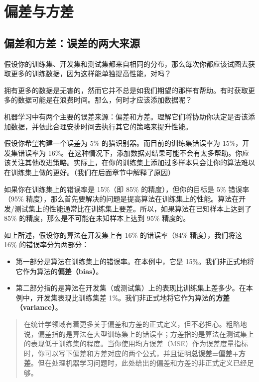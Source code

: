\hypertarget{ux504fux5deeux4e8eux65b9ux5dee}{%
\part{偏差与方差}\label{ux504fux5deeux4e8eux65b9ux5dee}}

\hypertarget{ux504fux5deeux548cux65b9ux5deeux8befux5deeux7684ux4e24ux5927ux6765ux6e90}{%
\chapter{偏差和方差：误差的两大来源}\label{ux504fux5deeux548cux65b9ux5deeux8befux5deeux7684ux4e24ux5927ux6765ux6e90}}

假设你的训练集、开发集和测试集都来自相同的分布，那么每次你都应该试图去获取更多的训练数据，因为这样能单独提高性能，对吗？

拥有更多的数据是无害的，然而它并不总是如我们期望的那样有帮助。有时获取更多的数据可能是在浪费时间。那么，何时才应该添加数据呢？

机器学习中有两个主要的误差来源：偏差和方差。理解它们将协助你决定是否该添加数据，并依此合理安排时间去执行其它的策略来提升性能。

假设你希望构建一个误差为 5\% 的猫识别器。而目前的训练集错误率为
15\%，开发集错误率为
16\%。在这种情况下，添加数据对结果可能不会有太多帮助。你应该关注其他改进策略。实际上，在你的训练集上添加过多样本只会让你的算法难以在训练集上做的更好。（我们在后面章节中解释了原因）

如果你在训练集上的错误率是 15\%（即 85\% 的精度），但你的目标是 5\%
错误率（95\%
精度），那么首先要解决的问题是提高算法在训练集上的性能。算法在开发/测试集上的性能通常比在训练集上要差。所以，如果算法在已知样本上达到了
85\% 的精度，那么是不可能在未知样本上达到 95\% 精度的。

如上所述，假设你的算法在开发集上有 16\% 的错误率（84\% 精度），我们将这
16\% 的错误率分为两部分：

\begin{itemize}
\tightlist
\item
  第一部分是算法在训练集上的错误率。在本例中，它是
  15\%。我们非正式地将它作为算法的\textbf{偏差（bias）}。
\item
  第二部分指的是算法在开发集（或测试集）上的表现比训练集上差多少。在本例中，开发集表现比训练集差
  1\%。我们非正式地将它作为算法的\textbf{方差（variance）}。
\end{itemize}

\begin{quote}
在统计学领域有着更多关于偏差和方差的正式定义，但不必担心。粗略地说，偏差指的是算法在大型训练集上的错误率；方差指的是算法在测试集上的表现低于训练集的程度。当你使用均方误差（MSE）作为误差度量指标时，你可以写下偏差和方差对应的两个公式，并且证明\textbf{总误差=偏差+方差}。但在处理机器学习问题时，此处给出的偏差和方差的非正式定义已经足够。
\end{quote}

